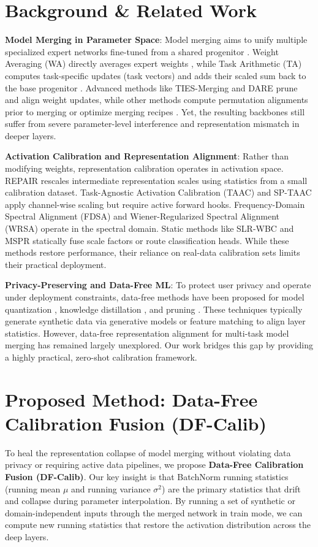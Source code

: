 \documentclass{article}
\theoremstyle{plain}
\theoremstyle{definition}
\theoremstyle{remark}
\begin{document}
\section{Background \& Related Work}
\textbf{Model Merging in Parameter Space}: Model merging aims to unify multiple specialized expert networks fine-tuned from a shared progenitor \cite{Wortsman2022, Tang2023, Xu2024}. Weight Averaging (WA) directly averages expert weights \cite{Wortsman2022}, while Task Arithmetic (TA) computes task-specific updates (task vectors) and adds their scaled sum back to the base progenitor \cite{Ilharco2023}. Advanced methods like TIES-Merging \cite{Yadav2023} and DARE \cite{Yu2023} prune and align weight updates, while other methods compute permutation alignments prior to merging \cite{Ainsworth2023, Stoica2023} or optimize merging recipes \cite{Akiba2024}. Yet, the resulting backbones still suffer from severe parameter-level interference and representation mismatch in deeper layers.

\textbf{Activation Calibration and Representation Alignment}: Rather than modifying weights, representation calibration operates in activation space. REPAIR \cite{Jordan2023} rescales intermediate representation scales using statistics from a small calibration dataset. Task-Agnostic Activation Calibration (TAAC) and SP-TAAC \cite{sptaac2026} apply channel-wise scaling but require active forward hooks. Frequency-Domain Spectral Alignment (FDSA) \cite{fdsa2025} and Wiener-Regularized Spectral Alignment (WRSA) \cite{wrsa2026} operate in the spectral domain. Static methods like SLR-WBC \cite{slr_wbc2026} and MSPR \cite{mspr2026} statically fuse scale factors or route classification heads. While these methods restore performance, their reliance on real-data calibration sets limits their practical deployment.

\textbf{Privacy-Preserving and Data-Free ML}: To protect user privacy and operate under deployment constraints, data-free methods have been proposed for model quantization \cite{Nagel2019, Cai2020, Chen2020}, knowledge distillation \cite{Yin2020, Nayak2019, Fang2019, Lopes2020}, and pruning \cite{Gu2021}. These techniques typically generate synthetic data via generative models or feature matching to align layer statistics. However, data-free representation alignment for multi-task model merging has remained largely unexplored. Our work bridges this gap by providing a highly practical, zero-shot calibration framework.

\section{Proposed Method: Data-Free Calibration Fusion (DF-Calib)}
To heal the representation collapse of model merging without violating data privacy or requiring active data pipelines, we propose \textbf{Data-Free Calibration Fusion (DF-Calib)}. Our key insight is that BatchNorm running statistics (running mean $\mu$ and running variance $\sigma^2$) are the primary statistics that drift and collapse during parameter interpolation. By running a set of synthetic or domain-independent inputs through the merged network in train mode, we can compute new running statistics that restore the activation distribution across the deep layers.
\end{document}
